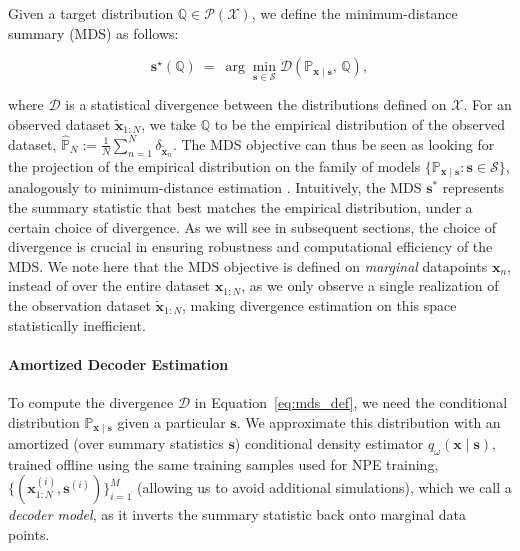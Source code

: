 \documentclass{article}
\theoremstyle{plain}
\theoremstyle{definition}
\theoremstyle{remark}
\begin{document}
Given a target distribution \( \mathbb{Q} \in \mathcal{P}(\mathcal{X}) \), we define the minimum-distance summary (MDS) as follows:

\begin{equation}
\label{eq:mds_def}
\mathbf{s}^\star(\mathbb{Q})
~=~
\arg\min_{\mathbf{s}\in\mathcal{S}}
\mathcal{D}\!\left(\mathbb{P}_{\mathbf{x}\mid \mathbf{s}},\,\mathbb{Q}\right),
\end{equation}

where \( \mathcal{D} \) is a statistical divergence between the distributions defined on \( \mathcal{X} \). For an observed dataset \( \tilde{\mathbf{x}}_{1:N} \), we take \( \mathbb{Q} \) to be the empirical distribution of the observed dataset, $\hat{\mathbb{P}}_N := \frac{1}{N}\sum_{n=1}^N \delta_{\tilde{\mathbf{x}}_n}$. The MDS objective can thus be seen as looking for the projection of the empirical distribution on the family of models \( \{\mathbb{P}_{\mathbf{x}\mid \mathbf{s}} : \mathbf{s} \in \mathcal{S} \} \), analogously to minimum-distance estimation \citep{wolfowitzMinimumDistanceMethod1957}. Intuitively, the MDS \( \mathbf{s}^* \) represents the summary statistic that best matches the empirical distribution, under a certain choice of divergence. As we will see in subsequent sections, the choice of divergence is crucial in ensuring robustness and computational efficiency of the MDS. We note here that the MDS objective is defined on \emph{marginal} datapoints \( \mathbf{x}_n \), instead of over the entire dataset \( \mathbf{x}_{1:N} \), as we only observe a single realization of the observation dataset \( \tilde{\mathbf{x}}_{1:N} \), making divergence estimation on this space statistically inefficient.

\paragraph{Amortized Decoder Estimation}

To compute the divergence \( \mathcal{D} \) in Equation~\eqref{eq:mds_def}, we need the conditional distribution \( \mathbb{P}_{\mathbf{x} \mid \mathbf{s}} \) given a particular $\mathbf{s}$. We approximate this distribution with an amortized (over summary statistics \( \mathbf{s} \)) conditional density estimator \( q_\omega(\mathbf{x} \mid \mathbf{s}) \), trained offline using the same training samples used for NPE training, \( \{(\mathbf{x}_{1:N}^{(i)}, \mathbf{s}^{(i)})\}_{i=1}^M \) (allowing us to avoid additional simulations), which we call a \emph{decoder model}, as it inverts the summary statistic back onto marginal data points. 
\end{document}
